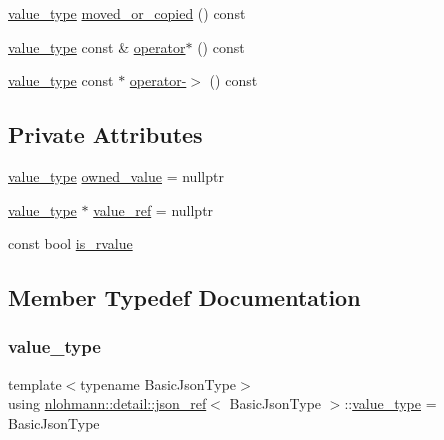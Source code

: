 \begin{DoxyCompactItemize}
\hyperlink{classnlohmann_1_1detail_1_1json__ref_a78d76cf288141049568c0d670ed670ef}{value\+\_\+type} \hyperlink{classnlohmann_1_1detail_1_1json__ref_ae39e523218bf05cac3fb5b5b1cd5efb6}{moved\+\_\+or\+\_\+copied} () const
\item 
\hyperlink{classnlohmann_1_1detail_1_1json__ref_a78d76cf288141049568c0d670ed670ef}{value\+\_\+type} const  \& \hyperlink{classnlohmann_1_1detail_1_1json__ref_aa3100e41472dba02ab78ccc1607e44ab}{operator$\ast$} () const
\item 
\hyperlink{classnlohmann_1_1detail_1_1json__ref_a78d76cf288141049568c0d670ed670ef}{value\+\_\+type} const  $\ast$ \hyperlink{classnlohmann_1_1detail_1_1json__ref_adb652774a67829876449dc0b30637456}{operator-\/$>$} () const
\end{DoxyCompactItemize}
\subsection*{Private Attributes}
\begin{DoxyCompactItemize}
\item 
\hyperlink{classnlohmann_1_1detail_1_1json__ref_a78d76cf288141049568c0d670ed670ef}{value\+\_\+type} \hyperlink{classnlohmann_1_1detail_1_1json__ref_a5d7bd67a5ab713d9be1e248cf9d509cd}{owned\+\_\+value} = nullptr
\item 
\hyperlink{classnlohmann_1_1detail_1_1json__ref_a78d76cf288141049568c0d670ed670ef}{value\+\_\+type} $\ast$ \hyperlink{classnlohmann_1_1detail_1_1json__ref_a23504615c2076070d5e087443bb376a4}{value\+\_\+ref} = nullptr
\item 
const bool \hyperlink{classnlohmann_1_1detail_1_1json__ref_a434d1e18c21cc1b61954ba22b62ee7a5}{is\+\_\+rvalue}
\end{DoxyCompactItemize}


\subsection{Member Typedef Documentation}
\mbox{\label{classnlohmann_1_1detail_1_1json__ref_a78d76cf288141049568c0d670ed670ef}} 
\subsubsection{\texorpdfstring{value\+\_\+type}{value\_type}}
{\footnotesize\ttfamily template$<$typename Basic\+Json\+Type$>$ \\
using \hyperlink{classnlohmann_1_1detail_1_1json__ref}{nlohmann\+::detail\+::json\+\_\+ref}$<$ Basic\+Json\+Type $>$\+::\hyperlink{classnlohmann_1_1detail_1_1json__ref_a78d76cf288141049568c0d670ed670ef}{value\+\_\+type} =  Basic\+Json\+Type}



